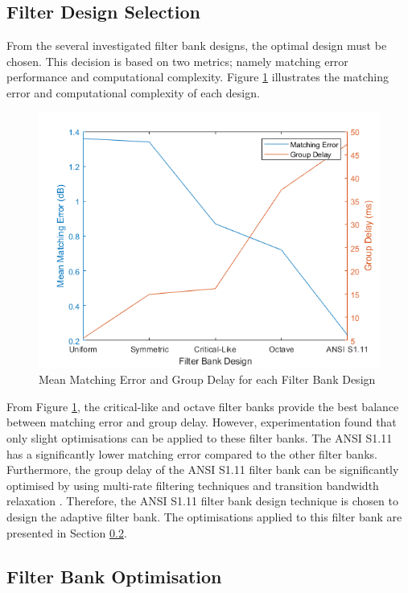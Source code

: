 \documentclass[12pt, onecolumn]{article}
\begin{document}
\subsection{Filter Design Selection}
\label{sec:filtSelect}

\noindent From the several investigated filter bank designs, the optimal design must be chosen. This decision is based on two metrics; namely matching error performance and computational complexity. Figure \ref{fig:matErrDelay} illustrates the matching error and computational complexity of each design.

\begin{figure}[h]
\centering
\includegraphics[width=0.6\linewidth]{matErrDelay.PNG}
\caption{Mean Matching Error and Group Delay for each Filter Bank Design}
\label{fig:matErrDelay}
\end{figure}

\noindent From Figure \ref{fig:matErrDelay}, the critical-like and octave filter banks provide the best balance between matching error and group delay. However, experimentation found that only slight optimisations can be applied to these filter banks. The ANSI S1.11 has a significantly lower matching error compared to the other filter banks. Furthermore, the group delay of the ANSI S1.11 filter bank can be significantly optimised by using multi-rate filtering techniques and transition bandwidth relaxation \cite{chang}. Therefore, the ANSI S1.11 filter bank design technique is chosen to design the adaptive filter bank. The optimisations applied to this filter bank are presented in Section \ref{sec:filtBankOpt}.

\subsection{Filter Bank Optimisation}
\label{sec:filtBankOpt}
\end{document}
